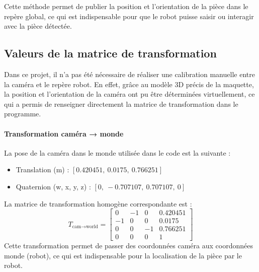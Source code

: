 Cette méthode permet de publier la position et l'orientation de la pièce dans le repère global, ce qui est indispensable pour que le robot puisse saisir ou interagir avec la pièce détectée.

\subsection{Valeurs de la matrice de transformation}

Dans ce projet, il n'a pas été nécessaire de réaliser une calibration manuelle entre la caméra et le repère robot. En effet, grâce au modèle 3D précis de la maquette, la position et l'orientation de la caméra ont pu être déterminées virtuellement, ce qui a permis de renseigner directement la matrice de transformation dans le programme.

\begin{minipage}{0.55\textwidth}
    \paragraph{Transformation caméra → monde}
    La pose de la caméra dans le monde utilisée dans le code est la suivante :
    \begin{itemize}
        \item Translation (m) : $[0.420451,\ 0.0175,\ 0.766251]$
        \item Quaternion (w, x, y, z) : $[0,\ -0.707107,\ 0.707107,\ 0]$
    \end{itemize}
    {}%
    La matrice de transformation homogène correspondante est :
    \begin{equation*}
        T_{\text{cam} \to \text{world}} =
        \begin{bmatrix}
            0  & -1 & 0  & 0.420451 \\
            -1 & 0  & 0  & 0.0175   \\
            0  & 0  & -1 & 0.766251 \\
            0  & 0  & 0  & 1
        \end{bmatrix}
    \end{equation*}
    Cette transformation permet de passer des coordonnées caméra aux coordonnées monde (robot), ce qui est indispensable pour la localisation de la pièce par le robot.
\end{minipage}%
\hfill
